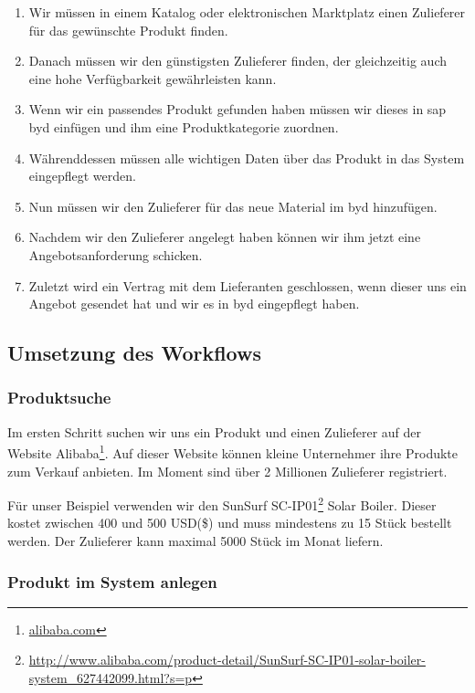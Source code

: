 \begin{enumerate}
 \item Wir müssen in einem Katalog oder elektronischen Marktplatz einen Zulieferer für das gewünschte Produkt finden.
 \item Danach müssen wir den günstigsten Zulieferer finden, der gleichzeitig auch eine hohe Verfügbarkeit gewährleisten kann.
 \item Wenn wir ein passendes Produkt gefunden haben müssen wir dieses in \gls{sap} \gls{byd} einfügen und ihm eine Produktkategorie zuordnen.
 \item Währenddessen müssen alle wichtigen Daten über das Produkt in das System eingepflegt werden.
 \item Nun müssen wir den Zulieferer für das neue Material im \gls{byd} hinzufügen.
 \item Nachdem wir den Zulieferer angelegt haben können wir ihm jetzt eine Angebotsanforderung schicken.
 \item Zuletzt wird ein Vertrag mit dem Lieferanten geschlossen, wenn dieser uns ein Angebot gesendet hat und wir es in \gls{byd} eingepflegt haben. 
 \end{enumerate}

\subsection{Umsetzung des Workflows}
\label{sec:byd-bsp-umsetzung}

\subsubsection{Produktsuche}

Im ersten Schritt suchen wir uns ein Produkt und einen Zulieferer auf der Website Alibaba\footnote{\url{alibaba.com}}. Auf dieser Website können kleine Unternehmer ihre Produkte zum Verkauf anbieten. Im Moment sind über 2 Millionen Zulieferer registriert.

Für unser Beispiel verwenden wir den SunSurf SC-IP01\footnote{\url{http://www.alibaba.com/product-detail/SunSurf-SC-IP01-solar-boiler-system_627442099.html?s=p}} Solar Boiler. Dieser kostet zwischen 400 und 500 USD(\$) und muss mindestens zu 15 Stück bestellt werden. Der Zulieferer kann maximal 5000 Stück im Monat liefern.

\subsubsection{Produkt im System anlegen}

